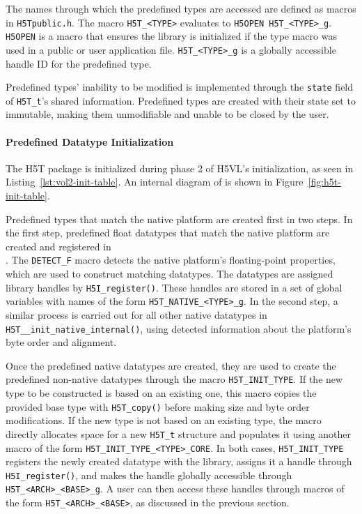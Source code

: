 The names through which the predefined types are accessed are defined as macros in \texttt{H5Tpublic.h}. The macro \texttt{H5T\_<TYPE>} evaluates to \texttt{H5OPEN H5T\_<TYPE>\_g}. \texttt{H5OPEN} is a macro that ensures the library is initialized if the type macro was used in a public or user application file. \texttt{H5T\_<TYPE>\_g} is a globally accessible handle ID for the predefined type.

Predefined types' inability to be modified is implemented through the \texttt{state} field of \texttt{H5T\_t}'s shared information. Predefined types are created with their state set to immutable, making them unmodifiable and unable to be closed by the user.

\paragraph{Predefined Datatype Initialization} The H5T package is initialized during phase 2 of H5VL's initialization, as seen in Listing~\ref{lst:vol2-init-table}. An internal diagram of  is shown in Figure~\ref{fig:h5t-init-table}.

Predefined types that match the native platform are created first in two steps. In the first step, predefined float datatypes that match the native platform are created and registered in \\ . The \texttt{DETECT\_F} macro detects the native platform's floating-point properties, which are used to construct matching datatypes. The datatypes are assigned library handles by \texttt{H5I\_register()}. These handles are stored in a set of global variables with names of the form \texttt{H5T\_NATIVE\_<TYPE>\_g}. In the second step, a similar process is carried out for all other native datatypes in \texttt{H5T\_\_init\_native\_internal()}, using detected information about the platform's byte order and alignment.

Once the predefined native datatypes are created, they are used to create the predefined non-native datatypes through the macro \texttt{H5T\_INIT\_TYPE}. If the new type to be constructed is based on an existing one, this macro copies the provided base type with \texttt{H5T\_copy()} before making size and byte order modifications. If the new type is not based on an existing type, the macro directly allocates space for a new \texttt{H5T\_t} structure and populates it using another macro of the form \texttt{H5T\_INIT\_TYPE\_<TYPE>\_CORE}. In both cases, \texttt{H5T\_INIT\_TYPE} registers the newly created datatype with the library, assigns it a handle through \texttt{H5I\_register()}, and makes the handle globally accessible through \texttt{H5T\_<ARCH>\_<BASE>\_g}. A user can then access these handles through macros of the form \texttt{H5T\_<ARCH>\_<BASE>}, as discussed in the previous section.

